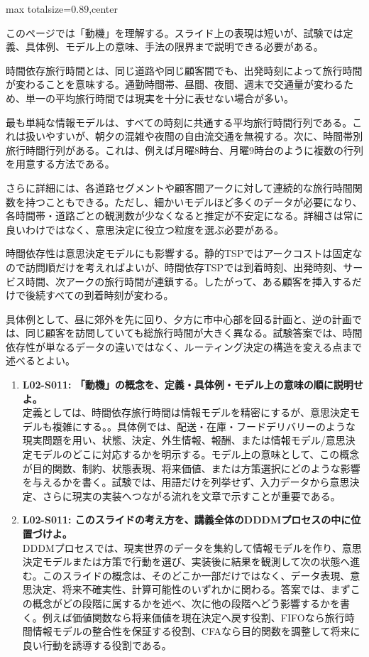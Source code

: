 \begin{minipage}[t]{0.58\textwidth}
\begin{adjustbox}{max totalsize={\textwidth}{0.89\textheight},center}
\begin{minipage}{\textwidth}\scriptsize
{}このページでは「動機」を理解する。スライド上の表現は短いが、試験では定義、具体例、モデル上の意味、手法の限界まで説明できる必要がある。\par
時間依存旅行時間とは、同じ道路や同じ顧客間でも、出発時刻によって旅行時間が変わることを意味する。通勤時間帯、昼間、夜間、週末で交通量が変わるため、単一の平均旅行時間では現実を十分に表せない場合が多い。\par
最も単純な情報モデルは、すべての時刻に共通する平均旅行時間行列である。これは扱いやすいが、朝夕の混雑や夜間の自由流交通を無視する。次に、時間帯別旅行時間行列がある。これは、例えば月曜8時台、月曜9時台のように複数の行列を用意する方法である。\par
さらに詳細には、各道路セグメントや顧客間アークに対して連続的な旅行時間関数を持つこともできる。ただし、細かいモデルほど多くのデータが必要になり、各時間帯・道路ごとの観測数が少なくなると推定が不安定になる。詳細さは常に良いわけではなく、意思決定に役立つ粒度を選ぶ必要がある。\par
時間依存性は意思決定モデルにも影響する。静的TSPではアークコストは固定なので訪問順だけを考えればよいが、時間依存TSPでは到着時刻、出発時刻、サービス時間、次アークの旅行時間が連鎖する。したがって、ある顧客を挿入するだけで後続すべての到着時刻が変わる。\par
具体例として、昼に郊外を先に回り、夕方に市中心部を回る計画と、逆の計画では、同じ顧客を訪問していても総旅行時間が大きく異なる。試験答案では、時間依存性が単なるデータの違いではなく、ルーティング決定の構造を変える点まで述べるとよい。\par{}\begin{enumerate}\item \textbf{L02-S011: 「動機」の概念を、定義・具体例・モデル上の意味の順に説明せよ。}\\定義としては、時間依存旅行時間は情報モデルを精密にするが、意思決定モデルも複雑にする。。具体例では、配送・在庫・フードデリバリーのような現実問題を用い、状態、決定、外生情報、報酬、または情報モデル/意思決定モデルのどこに対応するかを明示する。モデル上の意味として、この概念が目的関数、制約、状態表現、将来価値、または方策選択にどのような影響を与えるかを書く。試験では、用語だけを列挙せず、入力データから意思決定、さらに現実の実装へつながる流れを文章で示すことが重要である。\item \textbf{L02-S011: このスライドの考え方を、講義全体のDDDMプロセスの中に位置づけよ。}\\DDDMプロセスでは、現実世界のデータを集約して情報モデルを作り、意思決定モデルまたは方策で行動を選び、実装後に結果を観測して次の状態へ進む。このスライドの概念は、そのどこか一部だけではなく、データ表現、意思決定、将来不確実性、計算可能性のいずれかに関わる。答案では、まずこの概念がどの段階に属するかを述べ、次に他の段階へどう影響するかを書く。例えば価値関数なら将来価値を現在決定へ戻す役割、FIFOなら旅行時間情報モデルの整合性を保証する役割、CFAなら目的関数を調整して将来に良い行動を誘導する役割である。\end{enumerate}

\end{minipage}
\end{adjustbox}
\end{minipage}
